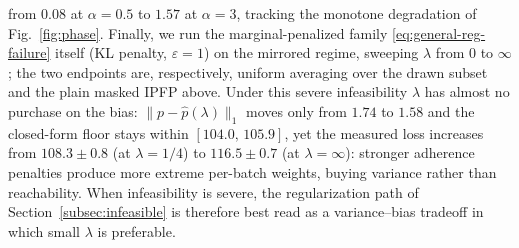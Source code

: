 \documentclass[9pt]{extarticle}
\theoremstyle{definition}
\begin{document}
from $0.08$ at $\alpha = 0.5$ to $1.57$ at $\alpha = 3$, tracking the
monotone degradation of Fig.~\ref{fig:phase}.
Finally, we run the marginal-penalized family
\eqref{eq:general-reg-failure} itself (KL penalty, $\varepsilon = 1$) on
the mirrored regime, sweeping $\lambda$ from $0$ to $\infty$; the two
endpoints are, respectively, uniform averaging over the drawn subset and
the plain masked IPFP above. Under this severe infeasibility $\lambda$ has
almost no purchase on the bias: $\|p - \hat{p}(\lambda)\|_1$ moves only
from $1.74$ to $1.58$ and the closed-form floor stays within
$[104.0,\,105.9]$, yet the measured loss increases from $108.3 \pm 0.8$
(at $\lambda = 1/4$) to $116.5 \pm 0.7$ (at $\lambda = \infty$): stronger
adherence penalties produce more extreme per-batch weights, buying
variance rather than reachability. When infeasibility is severe, the
regularization path of Section~\ref{subsec:infeasible} is therefore best
read as a variance--bias tradeoff in which small $\lambda$ is preferable.


\end{document}
